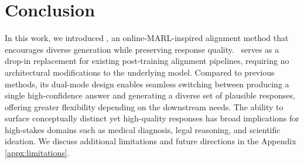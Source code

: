 \section{Conclusion}
\label{sec:conclusion}

In this work, we introduced \method, an online-MARL-inspired alignment method that encourages diverse generation while preserving response quality. \method~serves as a drop-in replacement for existing post-training alignment pipelines, requiring no architectural modifications to the underlying model. Compared to previous methods, its dual-mode design enables seamless switching between producing a single high-confidence answer and generating a diverse set of plausible responses, offering greater flexibility depending on the downstream needs. The ability to surface conceptually distinct yet high-quality responses has broad implications for high-stakes domains such as medical diagnosis, legal reasoning, and scientific ideation. We discuss additional limitations and future directions in the Appendix \ref{appx:limitations}.